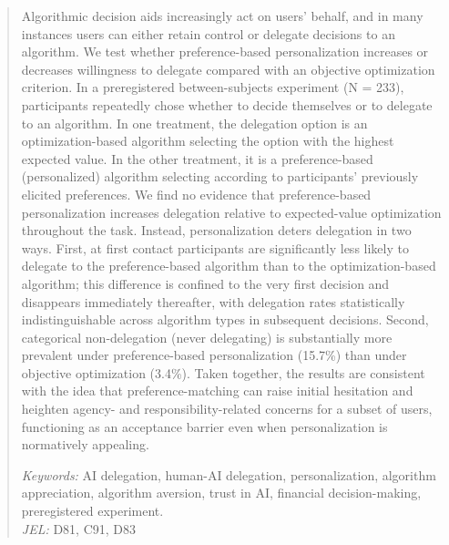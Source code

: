 \documentclass[a4paper, 12pt, fleqn]{article}
\theoremstyle{definition}
\begin{document}
\begin{abstract}
  Algorithmic decision aids increasingly act on users’ behalf, and in many instances users can either retain control or delegate decisions to an algorithm. We test whether preference-based personalization increases or decreases willingness to delegate compared with an objective optimization criterion. In a preregistered between-subjects experiment (N = 233), participants repeatedly chose whether to decide themselves or to delegate to an algorithm. In one treatment, the delegation option is an optimization-based algorithm selecting the option with the highest expected value. In the other treatment, it is a preference-based (personalized) algorithm selecting according to participants’ previously elicited preferences. We find no evidence that preference-based personalization increases delegation relative to expected-value optimization throughout the task. Instead, personalization deters delegation in two ways. First, at first contact participants are significantly less likely to delegate to the preference-based algorithm than to the optimization-based algorithm; this difference is confined to the very first decision and disappears immediately thereafter, with delegation rates statistically indistinguishable across algorithm types in subsequent decisions. Second, categorical non-delegation (never delegating) is substantially more prevalent under preference-based personalization (15.7\%) than under objective optimization (3.4\%). 
  Taken together, the results are consistent with the idea that preference-matching can raise initial hesitation and heighten agency- and responsibility-related concerns for a subset of users, functioning as an acceptance barrier even when personalization is normatively appealing.
  
     \vspace{.25cm}
  \textit{Keywords:} {AI delegation, human-AI delegation, personalization, algorithm appreciation, algorithm aversion, trust in AI, financial decision-making, preregistered experiment.}\vspace{.15cm}
  \\\textit{JEL:} {D81, C91, D83}
\end{abstract}
\vspace{-.5cm}
\end{document}
